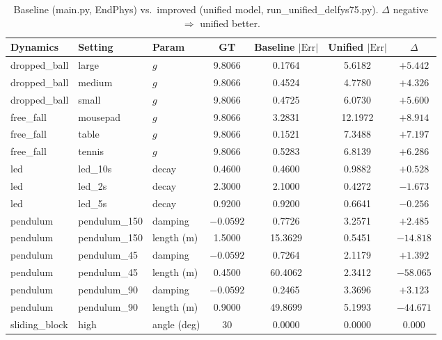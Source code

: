 \begin{table}[t]
\centering
\caption{Baseline (main.py, EndPhys) vs.\ improved (unified model, run\_unified\_delfys75.py). $\Delta$ negative $\Rightarrow$ unified better.}
\label{tab:unified}
\begin{tabular}{@{}lllS[table-format=2.4]S[table-format=2.4]S[table-format=2.4]S[table-format=-2.4]@{}}
\toprule
\textbf{Dynamics} & \textbf{Setting} & \textbf{Param} & {GT} & {Baseline $|\mathrm{Err}|$} & {Unified $|\mathrm{Err}|$} & {$\Delta$} \\
\midrule
dropped\_ball & large  & $g$ & 9.8066 & 0.1764 & 5.6182 & $+5.442$ \\
dropped\_ball & medium & $g$ & 9.8066 & 0.4524 & 4.7780 & $+4.326$ \\
dropped\_ball & small  & $g$ & 9.8066 & 0.4725 & 6.0730 & $+5.600$ \\
free\_fall    & mousepad & $g$ & 9.8066 & 3.2831 & 12.1972 & $+8.914$ \\
free\_fall    & table  & $g$ & 9.8066 & 0.1521 & 7.3488 & $+7.197$ \\
free\_fall    & tennis & $g$ & 9.8066 & 0.5283 & 6.8139 & $+6.286$ \\
led          & led\_10s & decay & 0.4600 & 0.4600 & 0.9882 & $+0.528$ \\
led          & led\_2s & decay & 2.3000 & 2.1000 & 0.4272 & $-1.673$ \\
led          & led\_5s & decay & 0.9200 & 0.9200 & 0.6641 & $-0.256$ \\
pendulum     & pendulum\_150 & damping & $-0.0592$ & 0.7726 & 3.2571 & $+2.485$ \\
pendulum     & pendulum\_150 & length (m) & 1.5000 & 15.3629 & 0.5451 & $-14.818$ \\
pendulum     & pendulum\_45 & damping & $-0.0592$ & 0.7264 & 2.1179 & $+1.392$ \\
pendulum     & pendulum\_45 & length (m) & 0.4500 & 60.4062 & 2.3412 & $-58.065$ \\
pendulum     & pendulum\_90 & damping & $-0.0592$ & 0.2465 & 3.3696 & $+3.123$ \\
pendulum     & pendulum\_90 & length (m) & 0.9000 & 49.8699 & 5.1993 & $-44.671$ \\
sliding\_block & high  & angle (deg) & 30 & 0.0000 & 0.0000 & 0.000 \\

\end{tabular}
\end{table}
